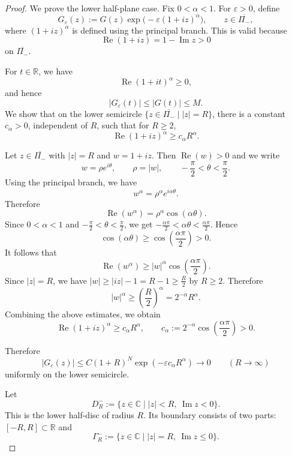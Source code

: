 \documentclass[12pt]{amsart}
\theoremstyle{definition}
\begin{document}
\begin{proof}
We prove the lower half-plane case. Fix \(0<\alpha<1\). For \(\varepsilon>0\), define
\[
        G_\varepsilon(z)
        :=
        G(z)\exp\bigl(-\varepsilon(1+iz)^\alpha\bigr),
        \qquad z\in\overline{\Pi_-},
\]
where \((1+iz)^\alpha\) is defined using the principal branch. This is valid
because
\[
        \operatorname{Re}(1+iz)=1-\operatorname{Im}z>0
\]
on \(\overline{\Pi_-}\).

For \(t\in\mathbb R\), we have
\[
        \operatorname{Re}(1+it)^\alpha\ge 0,
\]
and hence
\[
        |G_\varepsilon(t)|\le |G(t)|\le M.
\]
We show that on the lower semicircle \(\{z\in\overline{\Pi_-}\mid |z|=R\}\), there is a
constant \(c_\alpha>0\), independent of \(R\), such that for \(R\ge 2\), 
\[
        \operatorname{Re}(1+iz)^\alpha\ge c_\alpha R^\alpha .
\]

Let $z\in \overline{\Pi_-}$ with $|z|=R$ and $w=1+iz$. 
Then \(\operatorname{Re}(w)>0\) and we write 
\[
        w=\rho e^{i\theta},
        \qquad \rho=|w|,\qquad -\frac{\pi}{2}<\theta<\frac{\pi}{2}.
\]
Using the principal branch, we have
\[
        w^\alpha=\rho^\alpha e^{i\alpha\theta}.
\]
Therefore
\[
        \operatorname{Re}(w^\alpha)
        =
        \rho^\alpha\cos(\alpha\theta).
\]
Since \(0<\alpha<1\) and \(-\frac{\pi}{2}<\theta<\frac{\pi}{2}\),
we get \(-\frac{\alpha\pi}{2}
        <
        \alpha\theta
        <
        \frac{\alpha\pi}{2}.\)
Hence
\[
        \cos(\alpha\theta)
        \ge
        \cos\left(\frac{\alpha\pi}{2}\right)
        >
        0.
\]
It follows that
\[
        \operatorname{Re}(w^\alpha)
        \ge
        |w|^\alpha
        \cos\left(\frac{\alpha\pi}{2}\right).
\]
Since $|z|=R$, we have $|w|\ge |iz|-1=R-1\ge \frac{R}{2}$ by $R\ge 2$. 
Therefore
\[
        |w|^\alpha
        \ge
        \left(\frac{R}{2}\right)^\alpha
        =
        2^{-\alpha}R^\alpha.
\]
Combining the above estimates, we obtain
\[
       \operatorname{Re}(1+iz)^\alpha
        \geq c_\alpha R^\alpha,
        \qquad
        c_\alpha:=2^{-\alpha}\cos\left(\frac{\alpha\pi}{2}\right)>0.
\]
 

Therefore
\[
        |G_\varepsilon(z)|
        \le
        C(1+R)^N \exp(-\varepsilon c_\alpha R^\alpha)
        \longrightarrow 0
        \qquad (R\to\infty)
\]
uniformly on the lower semicircle.

Let
\[
        D_R^-:=\{z\in\mathbb C\mid |z|<R,\ \operatorname{Im}z<0\}.
\]
This is the lower half-disc of radius \(R\). Its boundary consists of two parts: $[-R,R]\subset \mathbb R
$ 
and
\[
        \Gamma_R^-:=\{z\in\mathbb C\mid |z|=R,\ \operatorname{Im}z\le 0\}.
\]


\end{proof}
\end{document}
